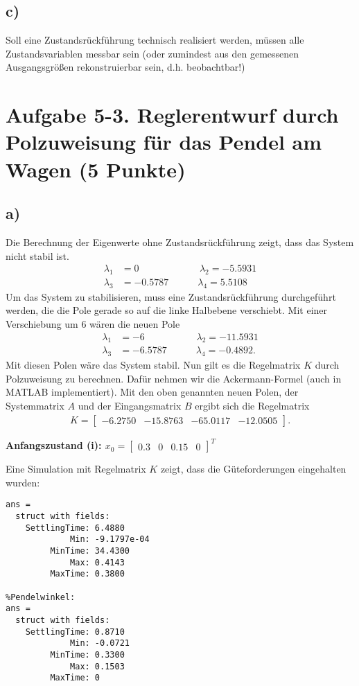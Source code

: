 \documentclass[11pt]{scrartcl} %
\begin{document}
\subsection*{c)}
Soll eine Zustandsrückführung technisch realisiert werden, müssen alle Zustandsvariablen messbar sein (oder zumindest aus den gemessenen Ausgangsgrößen rekonstruierbar sein, d.h. beobachtbar!)


\section*{Aufgabe 5-3. Reglerentwurf durch Polzuweisung für das Pendel am Wagen (5 Punkte)}
\subsection*{a)}
Die Berechnung der Eigenwerte ohne Zustandsrückführung zeigt, dass das System nicht stabil ist.
\begin{align*}
\lambda_1 &= 0 \quad\quad\quad\quad\quad\quad\hspace{3pt} \lambda_2 =  -5.5931\\
\lambda_3 &= -0.5787 \quad\quad\quad \lambda_4 = 5.5108
\end{align*}
Um das System zu stabilisieren, muss eine Zustandsrückführung durchgeführt werden, die die Pole gerade so auf die linke Halbebene verschiebt. Mit einer Verschiebung um 6 wären die neuen Pole
\begin{align*}
\lambda_1 &= -6 \quad\quad\quad\quad\quad\hspace{4pt} \lambda_2 =  -11.5931\\
\lambda_3 &= -6.5787 \quad\quad\quad \lambda_4 = -0.4892.
\end{align*}
Mit diesen Polen wäre das System stabil. Nun gilt es die Regelmatrix $K$ durch Polzuweisung zu berechnen. Dafür nehmen wir die Ackermann-Formel (auch in MATLAB implementiert). Mit den oben genannten neuen Polen, der Systemmatrix $A$ und der Eingangsmatrix $B$ ergibt sich die Regelmatrix
\begin{align*}
K=\begin{bmatrix}
-6.2750 & -15.8763 & -65.0117 & -12.0505
\end{bmatrix}.
\end{align*}

\pagebreak
\textbf{Anfangszustand (i): $x_0 = \begin{bmatrix}
0.3 & 0 & 0.15 & 0
\end{bmatrix}^T$}

Eine Simulation mit Regelmatrix $K$ zeigt, dass die Güteforderungen eingehalten wurden:
\begin{Verbatim}[frame=single]
%Wagenposition: 
ans = 
  struct with fields:
    SettlingTime: 6.4880
             Min: -9.1797e-04
         MinTime: 34.4300
             Max: 0.4143
         MaxTime: 0.3800

%Pendelwinkel:
ans = 
  struct with fields:
    SettlingTime: 0.8710
             Min: -0.0721
         MinTime: 0.3300
             Max: 0.1503
         MaxTime: 0
\end{Verbatim}
\end{document}
